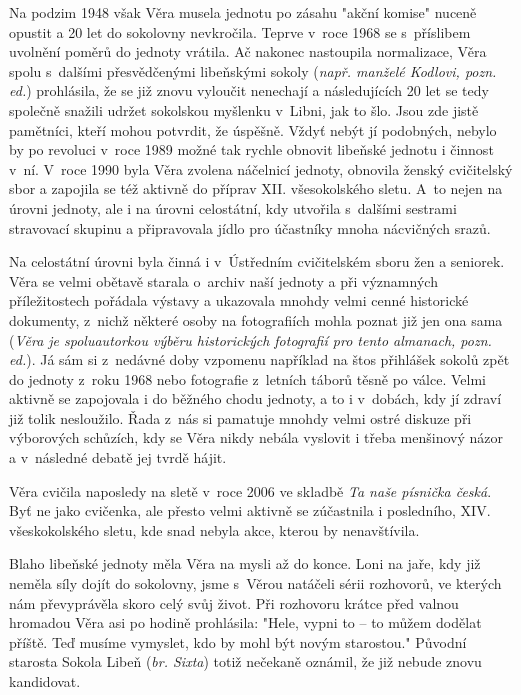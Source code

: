 \documentclass[a5paper, 11pt, twoside]{article}
\begin{document}
Na podzim 1948 však Věra musela jednotu po zásahu "akční komise" nuceně
opustit a 20 let do sokolovny nevkročila. Teprve v~roce 1968 se
s~příslibem uvolnění poměrů do jednoty vrátila. Ač nakonec nastoupila
normalizace, Věra spolu s~dalšími přesvědčenými libeňskými sokoly
(\textit{např. manželé Kodlovi, pozn. ed.}) prohlásila, že se již znovu
vyloučit nenechají a následujících 20 let se tedy společně snažili
udržet sokolskou myšlenku v~Libni, jak to šlo. Jsou zde jistě pamětníci,
kteří mohou potvrdit, že úspěšně. Vždyť nebýt jí podobných, nebylo by po
revoluci v~roce 1989 možné tak rychle obnovit libeňské jednotu i činnost
v~ní. V~roce 1990 byla Věra zvolena náčelnicí jednoty, obnovila ženský
cvičitelský sbor a zapojila se též aktivně do příprav XII. všesokolského
sletu. A~to nejen na úrovni jednoty, ale i na úrovni celostátní, kdy
utvořila s~dalšími sestrami stravovací skupinu a připravovala jídlo pro
účastníky mnoha nácvičných srazů.

Na celostátní úrovni byla činná i v~Ústředním cvičitelském sboru žen a
seniorek. Věra se velmi obětavě starala o~archiv naší jednoty a při
významných příležitostech pořádala výstavy a ukazovala mnohdy velmi
cenné historické dokumenty, z~nichž některé osoby na fotografiích mohla
poznat již jen ona sama (\textit{Věra je spoluautorkou výběru historických
fotografií pro tento almanach, pozn. ed.}). Já sám si z~nedávné doby
vzpomenu například na štos přihlášek sokolů zpět do jednoty z~roku 1968
nebo fotografie z~letních táborů těsně po válce. Velmi aktivně se
zapojovala i do běžného chodu jednoty, a to i v~dobách, kdy jí zdraví
již tolik nesloužilo. Řada z~nás si pamatuje mnohdy velmi ostré diskuze
při výborových schůzích, kdy se Věra nikdy nebála vyslovit i třeba
menšinový názor a v~následné debatě jej tvrdě hájit.

Věra cvičila naposledy na sletě v~roce 2006 ve skladbě \textit{Ta naše
písnička česká}. Byť ne jako cvičenka, ale přesto velmi aktivně se
zúčastnila i posledního, XIV. všeskokolského sletu, kde snad nebyla
akce, kterou by nenavštívila.

Blaho libeňské jednoty měla Věra na mysli až do konce. Loni na jaře, kdy
již neměla síly dojít do sokolovny, jsme s~Věrou natáčeli sérii
rozhovorů, ve kterých nám převyprávěla skoro celý svůj život. Při
rozhovoru krátce před valnou hromadou Věra asi po hodině prohlásila:
"Hele, vypni to -- to můžem dodělat příště. Teď musíme vymyslet, kdo by
mohl být novým starostou." Původní starosta Sokola Libeň (\textit{br.
Sixta}) totiž nečekaně oznámil, že již nebude znovu kandidovat.
\end{document}
